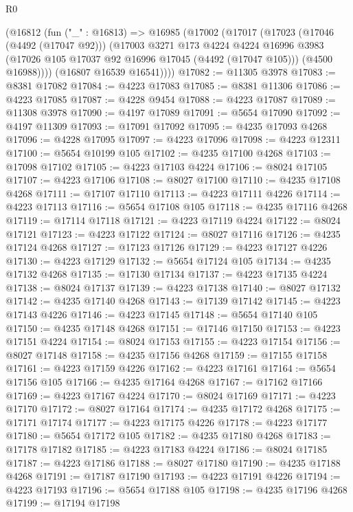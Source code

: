 \begin{lexlean}{R0}
\begin{coremodule}
    (@16812
      (fun ("_" : @16813) =>
      @16985
        (@17002
          (@17017
            (@17023
              (@17046 (@4492 (@17047 @92)))
              (@17003
                @3271
                @173
                @4224
                @4224
                @16996
                @3983
                (@17026 @105 @17037 @92 @16996 @17045 (@4492 (@17047 @105)))
                (@4500 @16988))))
          (@16807 @16539 @16541))))
@17082 := @11305 @3978
@17083 := @8381 @17082
@17084 := @4223 @17083
@17085 := @8381 @11306
@17086 := @4223 @17085
@17087 := @4228 @9454
@17088 := @4223 @17087
@17089 := @11308 @3978
@17090 := @4197 @17089
@17091 := @5654 @17090
@17092 := @4197 @11309
@17093 := @17091 @17092
@17095 := @4235 @17093 @4268
@17096 := @4228 @17095
@17097 := @4223 @17096
@17098 := @4223 @12311
@17100 := @5654 @10199 @105
@17102 := @4235 @17100 @4268
@17103 := @17098 @17102
@17105 := @4223 @17103 @4224
@17106 := @8024 @17105
@17107 := @4223 @17106
@17108 := @8027 @17100
@17110 := @4235 @17108 @4268
@17111 := @17107 @17110
@17113 := @4223 @17111 @4226
@17114 := @4223 @17113
@17116 := @5654 @17108 @105
@17118 := @4235 @17116 @4268
@17119 := @17114 @17118
@17121 := @4223 @17119 @4224
@17122 := @8024 @17121
@17123 := @4223 @17122
@17124 := @8027 @17116
@17126 := @4235 @17124 @4268
@17127 := @17123 @17126
@17129 := @4223 @17127 @4226
@17130 := @4223 @17129
@17132 := @5654 @17124 @105
@17134 := @4235 @17132 @4268
@17135 := @17130 @17134
@17137 := @4223 @17135 @4224
@17138 := @8024 @17137
@17139 := @4223 @17138
@17140 := @8027 @17132
@17142 := @4235 @17140 @4268
@17143 := @17139 @17142
@17145 := @4223 @17143 @4226
@17146 := @4223 @17145
@17148 := @5654 @17140 @105
@17150 := @4235 @17148 @4268
@17151 := @17146 @17150
@17153 := @4223 @17151 @4224
@17154 := @8024 @17153
@17155 := @4223 @17154
@17156 := @8027 @17148
@17158 := @4235 @17156 @4268
@17159 := @17155 @17158
@17161 := @4223 @17159 @4226
@17162 := @4223 @17161
@17164 := @5654 @17156 @105
@17166 := @4235 @17164 @4268
@17167 := @17162 @17166
@17169 := @4223 @17167 @4224
@17170 := @8024 @17169
@17171 := @4223 @17170
@17172 := @8027 @17164
@17174 := @4235 @17172 @4268
@17175 := @17171 @17174
@17177 := @4223 @17175 @4226
@17178 := @4223 @17177
@17180 := @5654 @17172 @105
@17182 := @4235 @17180 @4268
@17183 := @17178 @17182
@17185 := @4223 @17183 @4224
@17186 := @8024 @17185
@17187 := @4223 @17186
@17188 := @8027 @17180
@17190 := @4235 @17188 @4268
@17191 := @17187 @17190
@17193 := @4223 @17191 @4226
@17194 := @4223 @17193
@17196 := @5654 @17188 @105
@17198 := @4235 @17196 @4268
@17199 := @17194 @17198

\end{coremodule}
\end{lexlean}
